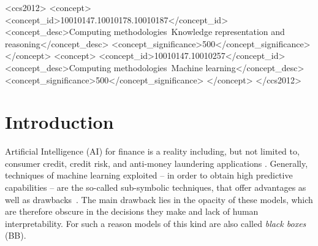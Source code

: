 \documentclass[sigconf]{acmart}
\begin{document}
\begin{CCSXML}
	<ccs2012>
	<concept>
	<concept_id>10010147.10010178.10010187</concept_id>
	<concept_desc>Computing methodologies~Knowledge representation and reasoning</concept_desc>
	<concept_significance>500</concept_significance>
	</concept>
	<concept>
	<concept_id>10010147.10010257</concept_id>
	<concept_desc>Computing methodologies~Machine learning</concept_desc>
	<concept_significance>500</concept_significance>
	</concept>
	</ccs2012>
\end{CCSXML}



\maketitle

\section{Introduction}

Artificial Intelligence (AI) for finance is a reality including, but not limited to, consumer credit, credit risk, and anti-money laundering applications \cite{aziz2019machine}. 
%
Generally, techniques of machine learning exploited -- in order to obtain high predictive capabilities -- are the so-called sub-symbolic techniques, that offer advantages as well as drawbacks~\cite{rocha2012far}.
%
The main drawback lies in the opacity of these models, which are therefore obscure in the decisions they make and lack of human interpretability.
%
For such a reason models of this kind are also called \emph{black boxes} (BB).
\end{document}
